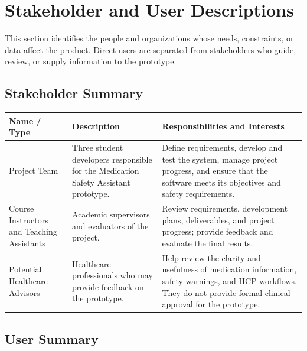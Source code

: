 \section{Stakeholder and User Descriptions}

This section identifies the people and organizations whose needs, constraints,
or data affect the product. Direct users are separated from stakeholders who
guide, review, or supply information to the prototype.

\subsection{Stakeholder Summary}

\begin{longtable}{|L{0.20\textwidth}|L{0.27\textwidth}|L{0.43\textwidth}|}
\hline
\textbf{Name / Type} &
\textbf{Description} &
\textbf{Responsibilities and Interests}\\ \hline

Project Team
& Three student developers responsible for the
Medication Safety Assistant prototype.
& Define requirements, develop and test the system,
manage project progress, and ensure that the
software meets its objectives and safety requirements.
\\ \hline

Course Instructors and Teaching Assistants
& Academic supervisors and evaluators of the project.
& Review requirements, development plans,
deliverables, and project progress; provide
feedback and evaluate the final results.
\\ \hline

Potential Healthcare Advisors
& Healthcare professionals who may provide
feedback on the prototype.
& Help review the clarity and usefulness of
medication information, safety warnings, and
HCP workflows. They do not provide formal
clinical approval for the prototype.
\\ \hline

\end{longtable}


\subsection{User Summary}

